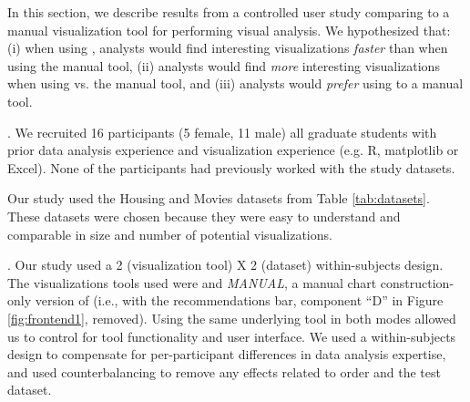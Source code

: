 In this section, we describe results from a controlled user study comparing 
\SeeDB to a manual visualization tool for performing visual analysis. 
We hypothesized that: (i) when using \SeeDB, analysts would find interesting 
visualizations {\em faster} than when using the manual tool, (ii) analysts
would find {\it more} interesting visualizations when using \SeeDB vs. the 
manual tool, and (iii) analysts would {\em prefer} using \SeeDB to a manual tool.


. We recruited 16 participants (5 female, 11
 male) all graduate students with prior data analysis experience and visualization
 experience (e.g. R, matplotlib or Excel).
 None of the participants had previously worked with the study datasets.

 Our study used the Housing and Movies datasets from 
 Table \ref{tab:datasets}.
 These  datasets were chosen because they were easy to understand and 
  comparable in size and number of potential visualizations.
 
.
Our study used a 2 (visualization tool) X 2 (dataset) within-subjects design.
The visualizations tools used were \SeeDB and {\em MANUAL}, a manual chart
construction-only version of \SeeDB (i.e., \SeeDB with the recommendations bar, 
component ``D'' in Figure \ref{fig:frontend1}, removed).
Using the same underlying tool in both modes allowed us to control for
tool functionality and user interface.
We used a within-subjects design to compensate for per-participant differences 
in data analysis expertise, and used counterbalancing to remove any effects 
related to order and the test dataset.

